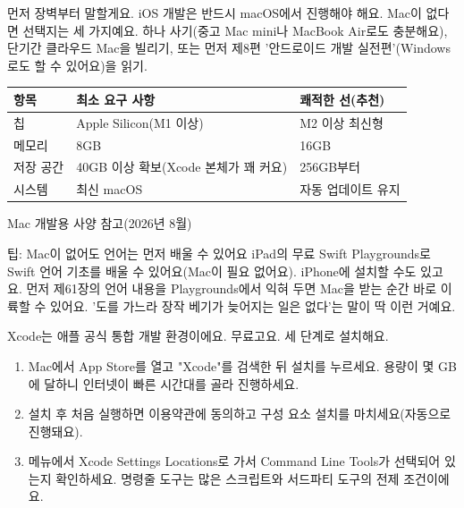 


먼저 장벽부터 말할게요. iOS 개발은 반드시 macOS에서 진행해야 해요. Mac이 없다면 선택지는 세 가지예요. 하나 사기(중고 Mac mini나 MacBook Air로도 충분해요), 단기간 클라우드 Mac을 빌리기, 또는 먼저 제8편 '안드로이드 개발 실전편'(Windows로도 할 수 있어요)을 읽기.

\begin{center}
\begin{tabularx}{\linewidth}{|X|X|X|}
\hline
\textbf{항목} & \textbf{최소 요구 사항} & \textbf{쾌적한 선(추천)} \tabularnewline
\hline
칩 & Apple Silicon(M1 이상) & M2 이상 최신형 \tabularnewline
메모리 & 8GB & 16GB \tabularnewline
저장 공간 & 40GB 이상 확보(Xcode 본체가 꽤 커요) & 256GB부터 \tabularnewline
시스템 & 최신 macOS & 자동 업데이트 유지 \tabularnewline
\hline
\end{tabularx}
\end{center}

\begin{center}\small\color{gray}Mac 개발용 사양 참고(2026년 8월)\end{center}

\begin{tcbinfo}{팁: Mac이 없어도 언어는 먼저 배울 수 있어요}
iPad의 무료 Swift Playgrounds로 Swift 언어 기초를 배울 수 있어요(Mac이 필요 없어요). iPhone에 설치할 수도 있고요. 먼저 제61장의 언어 내용을 Playgrounds에서 익혀 두면 Mac을 받는 순간 바로 이륙할 수 있어요. '도를 가느라 장작 베기가 늦어지는 일은 없다'는 말이 딱 이런 거예요.

\end{tcbinfo}


Xcode는 애플 공식 통합 개발 환경이에요. 무료고요. 세 단계로 설치해요.

\begin{enumerate}
  \item Mac에서 App Store를 열고 "Xcode"를 검색한 뒤 설치를 누르세요. 용량이 몇 GB에 달하니 인터넷이 빠른 시간대를 골라 진행하세요.
  \item 설치 후 처음 실행하면 이용약관에 동의하고 구성 요소 설치를 마치세요(자동으로 진행돼요).
  \item 메뉴에서 Xcode Settings Locations로 가서 Command Line Tools가 선택되어 있는지 확인하세요. 명령줄 도구는 많은 스크립트와 서드파티 도구의 전제 조건이에요.
\end{enumerate}

